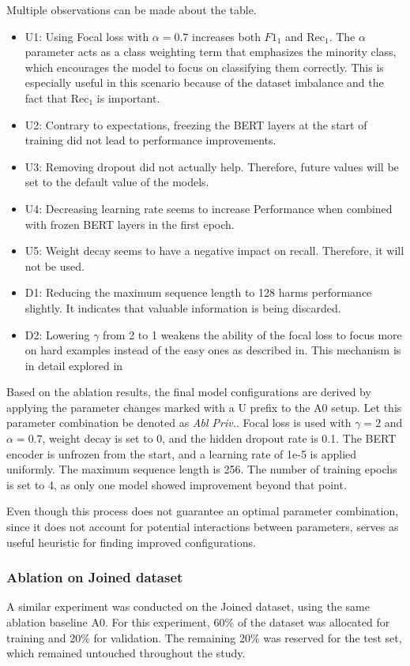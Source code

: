 Multiple observations can be made about the table.
\begin{itemize}
    \item U1: Using Focal loss with $\alpha = 0.7$ increases both $F1_1$ and Rec$_1$. The $\alpha$ parameter acts as a class weighting term that emphasizes the minority class, which encourages the model to focus on classifying them correctly. This is especially useful in this scenario because of the dataset imbalance and the fact that Rec$_1$ is important.
    \item U2: Contrary to expectations, freezing the BERT layers at the start of training did not lead to performance improvements.
    \item U3: Removing dropout did not actually help. Therefore, future values will be set to the default value of the models.
    \item U4: Decreasing learning rate seems to increase Performance when combined with frozen BERT layers in the first epoch.
    \item U5: Weight decay seems to have a negative impact on recall. Therefore, it will not be used.
    \item D1: Reducing the maximum sequence length to 128 harms performance slightly. It indicates that valuable information is being discarded.
    \item D2: Lowering $\gamma$ from 2 to 1 weakens the ability of the focal loss to focus more on hard examples instead of the easy ones as described in. This mechanism is in detail explored in~\cite{lin2018focallossdenseobject}
\end{itemize}

Based on the ablation results, the final model configurations are derived by applying the parameter changes marked with a U prefix to the A0 setup. Let this parameter combination be denoted as \textit{Abl Priv.}. Focal loss is used with $\gamma = 2$ and $\alpha = 0.7$, weight decay is set to 0, and the hidden dropout rate is 0.1. The BERT encoder is unfrozen from the start, and a learning rate of 1e-5 is applied uniformly. The maximum sequence length is 256. The number of training epochs is set to 4, as only one model showed improvement beyond that point.

Even though this process does not guarantee an optimal parameter combination, since it does not account for potential interactions between parameters, serves as useful heuristic for finding improved configurations.

\subsubsection*{Ablation on Joined dataset}
\label{sec:BERT-Tiny-finetune-joined}
A similar experiment was conducted on the Joined dataset, using the same ablation baseline A0. For this experiment, 60\% of the dataset was allocated for training and 20\% for validation. The remaining 20\% was reserved for the test set, which remained untouched throughout the study.

